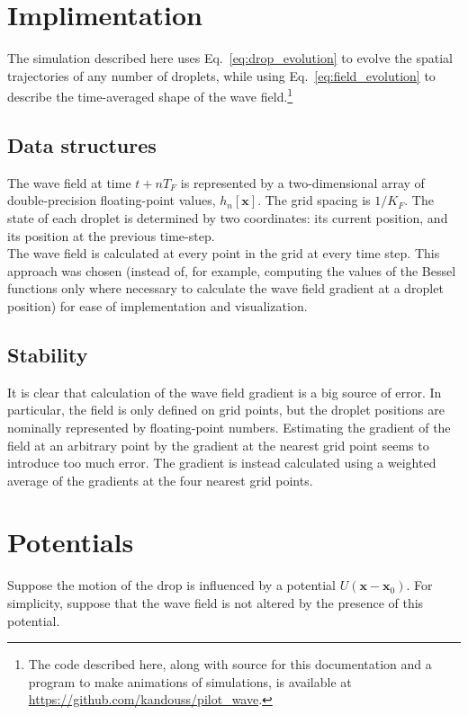 \documentclass{article}
\newcommand{\x}{\mathbf{x}}
\begin{document}
\section{Implimentation}
The simulation described here uses Eq.~\ref{eq:drop_evolution} to evolve the spatial trajectories of any number of droplets, while using Eq.~\ref{eq:field_evolution} to describe the time-averaged shape of the wave field.\footnote{The code described here, along with source for this documentation and a program to make animations of simulations, is available at \url{https://github.com/kandouss/pilot_wave}.}

\subsection{Data structures}
The wave field at time $t+n T_{F}$ is represented by a two-dimensional array of double-precision floating-point values, $h_{n}[\x]$. The grid spacing is $1/K_{F}$.
The state of each droplet is determined by two coordinates: its current position, and its position at the previous time-step.\\

The wave field is calculated at every point in the grid at every time step. This approach was chosen (instead of, for example, computing the values of the Bessel functions only where necessary to calculate the wave field gradient at a droplet position) for ease of implementation and visualization.

\subsection{Stability}
It is clear that calculation of the wave field gradient is a big source of error. In particular, the field is only defined on grid points, but the droplet positions are nominally represented by floating-point numbers. Estimating the gradient of the field at an arbitrary point by the gradient at the nearest grid point seems to introduce too much error. The gradient is instead calculated using a weighted average of the gradients at the four nearest grid points.\\
 

\section{Potentials}

Suppose the motion of the drop is influenced by a potential $U(\x-\x_0)$. For simplicity, suppose that the wave field is not altered by the presence of this potential.
\end{document}
